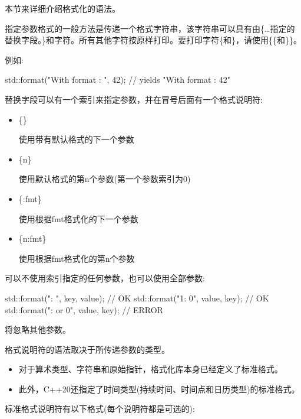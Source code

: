 
本节来详细介绍格式化的语法。


指定参数格式的一般方法是传递一个格式字符串，该字符串可以具有由\{…指定的替换字段。\}和字符。所有其他字符按原样打印。要打印字符\{和\}，请使用\{\{和\}\}。

例如:

\begin{cpp}
std::format("With format {{}}: {}", 42); // yields "With format {}: 42"
\end{cpp}

替换字段可以有一个索引来指定参数，并在冒号后面有一个格式说明符:

\begin{itemize}
\item 
\{\}

使用带有默认格式的下一个参数

\item 
\{n\}

使用默认格式的第n个参数(第一个参数索引为0)

\item 
\{:fmt\}

使用根据fmt格式化的下一个参数

\item 
\{n:fmt\}

使用根据fmt格式化的第n个参数
\end{itemize}

可以不使用索引指定的任何参数，也可以使用全部参数:

\begin{cpp}
std::format("{}: {}", key, value); // OK
std::format("{1}: {0}", value, key); // OK
std::format("{}: {} or {0}", value, key); // ERROR
\end{cpp}

将忽略其他参数。

格式说明符的语法取决于所传递参数的类型。

\begin{itemize}
\item 
对于算术类型、字符串和原始指针，格式化库本身已经定义了标准格式。

\item 
此外，C++20还指定了时间类型(持续时间、时间点和日历类型)的标准格式。
\end{itemize}


标准格式说明符有以下格式(每个说明符都是可选的):

